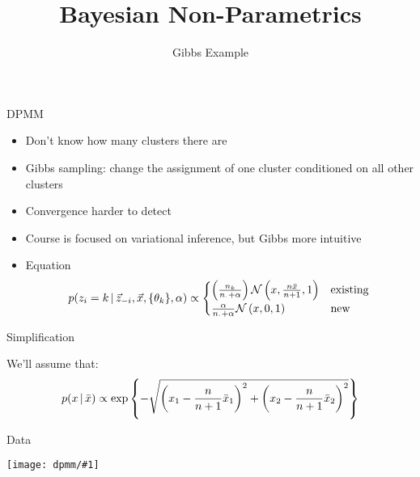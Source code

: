 \documentclass[compress]{beamer}
\title{Bayesian Non-Parametrics}
\date{Gibbs Example}
\newcommand{\gfx}[2]{
\begin{center}
	\texttt{[image: dpmm/\#1]}
\end{center}
}
\begin{document}
\frame{\titlepage
}

\begin{frame}{DPMM}

	\begin{itemize}
		\item Don't know how many clusters there are
		\item Gibbs sampling: change the assignment of one cluster conditioned on all other clusters
		\item Convergence harder to detect
                \item Course is focused on variational inference, but
                  Gibbs more intuitive
		\item Equation
		\begin{equation}
		p(z_i =k \, | \, \vec z_{-i}, \vec x, \{\theta_k\}, \alpha) \propto \begin{cases} \left( \frac{n_k}{n_\cdot + \alpha} \right) \mathcal{N}\left( x, \frac{n \bar{x}}{n + 1}, 1 \right) & \mbox{existing} \\
		\frac{\alpha}{n_\cdot + \alpha} \mathcal{N}\left( x, 0, 1 \right)  & \mbox{new} \end{cases}
		\end{equation}
	\end{itemize}

\end{frame}

\begin{frame}{Simplification}

	We'll assume that:
	\begin{equation}
		p(x \, | \, \bar x) \propto \mbox{exp}\left\{ -\sqrt{\left(x_1 - \frac{n}{n + 1}\bar x_1\right)^2 + \left(x_2 - \frac{n}{n+1} \bar x_2 \right)^2}\right\}
	\end{equation}

\end{frame}


\begin{frame}{Data}

	\gfx{dpmm0}{0.8}

\end{frame}
\end{document}
